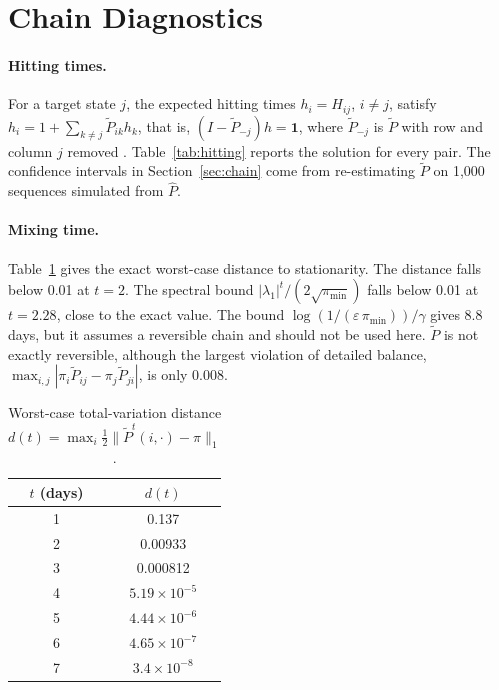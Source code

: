 \documentclass[11pt]{article}
\begin{document}
\clearpage
\section{Chain Diagnostics}
\label{app:diag}

\paragraph{Hitting times.} For a target state $j$, the expected hitting times $h_i = H_{ij}$, $i \neq j$, satisfy $h_i = 1 + \sum_{k \neq j} \tilde P_{ik} h_k$, that is, $(I - \tilde P_{-j})h = \mathbf 1$, where $\tilde P_{-j}$ is $\tilde P$ with row and column $j$ removed \cite{kemenysnell1976}. Table~\ref{tab:hitting} reports the solution for every pair. The confidence intervals in Section~\ref{sec:chain} come from re-estimating $\tilde P$ on 1{,}000 sequences simulated from $\hat P$.

\paragraph{Mixing time.} Table~\ref{tab:mixing} gives the exact worst-case distance to stationarity. The distance falls below 0.01 at $t = 2$. The spectral bound $|\lambda_1|^t/(2\sqrt{\pi_{\min}})$ falls below 0.01 at $t = 2.28$, close to the exact value. The bound $\log(1/(\varepsilon\,\pi_{\min}))/\gamma$ gives 8.8 days, but it assumes a reversible chain \cite{levinperes2017} and should not be used here. $\tilde P$ is not exactly reversible, although the largest violation of detailed balance, $\max_{i,j} |\pi_i \tilde P_{ij} - \pi_j \tilde P_{ji}|$, is only 0.008.

\begin{table}[htbp]\centering
\caption{Worst-case total-variation distance $d(t) = \max_i \tfrac12 \|\tilde P^t(i,\cdot) - \pi\|_1$.}
\label{tab:mixing}
\begin{tabular}{cc}
\toprule
$t$ (days) & $d(t)$ \\
\midrule
1 & 0.137 \\
2 & 0.00933 \\
3 & 0.000812 \\
4 & $5.19\times10^{-5}$ \\
5 & $4.44\times10^{-6}$ \\
6 & $4.65\times10^{-7}$ \\
7 & $3.4\times10^{-8}$ \\
\bottomrule
\end{tabular}
\end{table}
\end{document}
